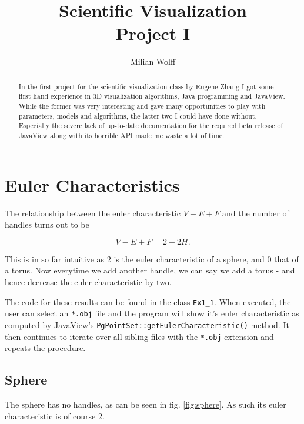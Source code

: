 \documentclass[a4paper,10pt,notitlepage]{scrreprt}
\title{Scientific Visualization\\Project I}
\author{Milian Wolff}
\begin{document}
\maketitle

\begin{abstract}
In the first project for the scientific visualization class by Eugene Zhang I
got some first hand experience in 3D visualization algorithms, Java programming
and JavaView. While the former was very interesting and gave many opportunities
to play with parameters, models and algorithms, the latter two I could have
done without. Especially the severe lack of up-to-date documentation for the
required beta release of JavaView along with its horrible API made me waste a
lot of time.
\end{abstract}

\begingroup
\let\clearpage\relax

\tableofcontents
\endgroup

\chapter{Euler Characteristics}

The relationship between the euler characteristic $V-E+F$ and the number of
handles turns out to be

\begin{equation}
 V-E+F = 2-2H .
 \label{eq:handle-euler}
\end{equation}

This is in so far intuitive as $2$ is the euler characteristic of a sphere, and
$0$ that of a torus. Now everytime we add another handle, we can say we add a
torus - and hence decrease the euler characteristic by two.

The code for these results can be found in the class \texttt{Ex1\_1}. When
executed, the user can select an \texttt{*.obj} file and the program will
show it's euler characteristic as computed by JavaView's
\texttt{PgPointSet::getEulerCharacteristic()} method. It then continues to
iterate over all sibling files with the \texttt{*.obj} extension and repeats the
procedure.

\section{Sphere}

The sphere has no handles, as can be seen in fig. \ref{fig:sphere}. As such its
euler characteristic is of course $2$.
\end{document}
